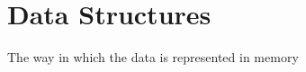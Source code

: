 
\part{Data Structures}
\label{prt:data_structures}

The way in which the data is represented in memory

